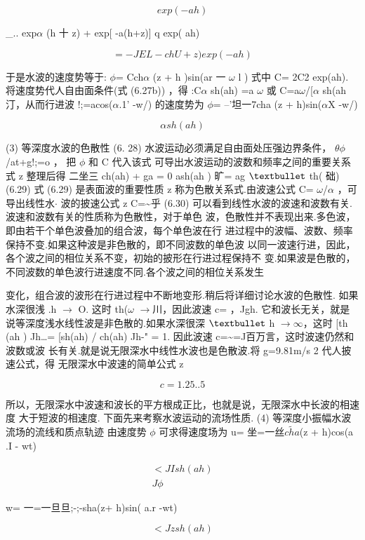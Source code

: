\[exp(- ah)\]

\_.. exp$\alpha$ (h 十 z) + exp[ -a(h+z)] q exp( ah)

\[=-JEL-chU+z) exp(- ah)\]

于是水波的速度势等于: $\phi$= Cch$\alpha$ (z + h )sin(ar 一 $\omega$ l ) 式中 C= 2C2 exp(ah). 将速度势代人自由面条件(式 (6.27b)) ，得 :C$\alpha$ sh(ah) =a $\omega$ 或 C=a$\omega$/[$\alpha$ sh(ah 汀，从而行进波 !;=acos($\alpha$.1' -w/) 的速度势为 $\phi$= --'坦一7cha (z + h)sin($\alpha$X -w/)

\[\alpha sh(ah )\]

(3) 等深度水波的色散性 (6. 28) 水波运动必须满足自由面处压强边界条件， $\theta$$\phi$/at+g!;=o ， 把 $\phi$ 和 C 代入该式 可导出水波运动的波数和频率之间的重要关系式 z 整理后得 二坐三 ch(ah) + ga = 0 ash(ah ) 旷= ag ${\rm •}$ th( 础) (6.29) 式 (6.29) 是表面波的重要性质 z 称为色散关系式.由波速公式 C= $\omega$/$\alpha$ ，可导出线性水$\cdot $ 波的披速公式 z C=\textasciitilde{}乎 (6.30) 可以看到线性水波的波速和波数有关.波速和波数有关的性质称为色散性，对于单色 波，色散性并不表现出来.多色波，即由若干个单色波叠加的组合波，每个单色波在行 进过程中的波幅、波数、频率保持不变.如果这种波是非色散的，即不同波数的单色波 以同一波速行进，因此，各个波之间的相位关系不变，初始的披形在行进过程保持不 变.如果波是色散的，不同波数的单色波行进速度不同.各个波之间的相位关系发生

变化，组合波的波形在行进过程中不断地变形.稍后将详细讨论水波的色散性. 如果水深很浅 .h $\rightarrow$ O. 这时 th($\omega$ $\rightarrow$川，因此波速 c= ，Jgh. 它和波长无关，就是 说等深度浅水线性波是非色散的.如果水深很深 ${\rm •}$ h $\rightarrow$$\infty$，这时 [th (ah ) Jh…= [sh(ah) / ch(ah) Jh-" = 1. 因此波速 c=\textasciitilde{}=J百万言，这时波速仍然和波数或波 长有关.就是说无限深水中线性水波也是色散波.将 g=9.81m/s 2 代人披速公式，得 无限深水中波速的简单公式 z

\[c = 1. 25 ..5\]

所以，无限深水中波速和波长的平方根成正比，也就是说，无限深水中长波的相速度 大于短波的相速度. 下面先来考察水波运动的流场性质. (4) 等深度小振幅水波流场的流线和质点轨迹 由速度势 $\phi$ 可求得速度场为 u= 坐=一丝$\tilde{cha}$(z + h)cos(a .I - wt)

\begin{gather*}
<JI sh(ah)\\
J\phi 
\end{gather*}

w= 一=一旦旦;-;-sha(z+ h)sin( a.r -wt)

\[<J z sh(ah)\]

